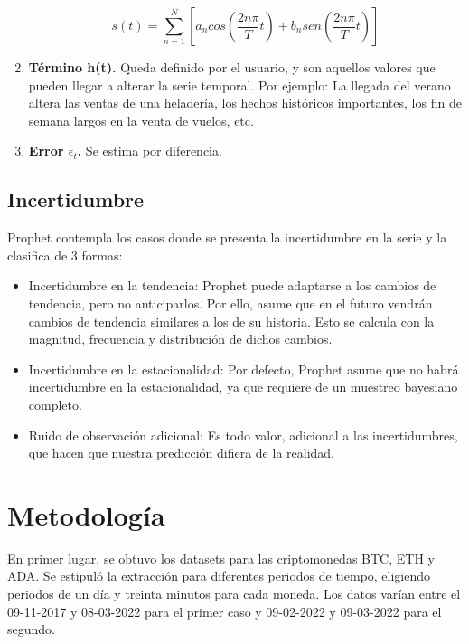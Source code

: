\documentclass[a4paper,10pt]{article}
\begin{document}
\begin{enumerate}
 \begin{equation}
  s(t) = \sum_{n=1}^N [a_n cos(\frac{2n\pi}{T}t) + b_n sen (\frac{2n\pi}{T}t) ]
 \end{equation}


 \item \textbf{Término h(t).} Queda definido por el usuario, y son aquellos valores que pueden llegar a alterar la serie temporal. Por ejemplo: La llegada del verano altera las ventas de una heladería, los hechos históricos importantes, los fin de semana largos en la venta de vuelos, etc.

 \item \textbf{Error $\epsilon_t$.} Se estima por diferencia.

\end{enumerate}

\subsection{Incertidumbre}

Prophet contempla los casos donde se presenta la incertidumbre en la serie y la clasifica de 3 formas:

\begin{itemize}
 \item Incertidumbre en la tendencia: Prophet puede adaptarse a los cambios de tendencia, pero no anticiparlos. Por ello, asume que en el futuro vendrán cambios de tendencia similares a los de su historia. Esto se calcula con la magnitud, frecuencia y distribución de dichos cambios.

 \item Incertidumbre en la estacionalidad: Por defecto, Prophet asume que no habrá incertidumbre en la estacionalidad, ya que requiere de un muestreo bayesiano completo.

 \item Ruido de observación adicional: Es todo valor, adicional a las incertidumbres, que hacen que nuestra predicción difiera de la realidad.
\end{itemize}



\section{Metodología}


En primer lugar, se obtuvo los datasets para las criptomonedas BTC, ETH y ADA. Se estipuló la extracción para diferentes periodos de tiempo, eligiendo periodos de un día y treinta minutos para cada moneda. Los datos varían entre el 09-11-2017 y 08-03-2022 para el primer caso y 09-02-2022 y 09-03-2022 para el segundo.
\end{document}
